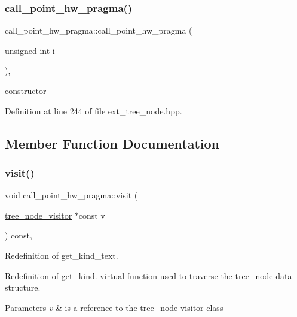 \subsubsection{\texorpdfstring{call\+\_\+point\+\_\+hw\+\_\+pragma()}{call\_point\_hw\_pragma()}}
{\footnotesize\ttfamily call\+\_\+point\+\_\+hw\+\_\+pragma\+::call\+\_\+point\+\_\+hw\+\_\+pragma (\begin{DoxyParamCaption}\item[{unsigned int}]{i }\end{DoxyParamCaption})\hspace{0.3cm}{\ttfamily [inline]}, {\ttfamily [explicit]}}



constructor 



Definition at line 244 of file ext\+\_\+tree\+\_\+node.\+hpp.



\subsection{Member Function Documentation}
\mbox{\label{structcall__point__hw__pragma_a3c039efe1da66ca0ab6445535aaa6eb2}} 
\subsubsection{\texorpdfstring{visit()}{visit()}}
{\footnotesize\ttfamily void call\+\_\+point\+\_\+hw\+\_\+pragma\+::visit (\begin{DoxyParamCaption}\item[{\hyperlink{classtree__node__visitor}{tree\+\_\+node\+\_\+visitor} $\ast$const}]{v }\end{DoxyParamCaption}) const\hspace{0.3cm}{\ttfamily [override]}, {\ttfamily [virtual]}}



Redefinition of get\+\_\+kind\+\_\+text. 

Redefinition of get\+\_\+kind. virtual function used to traverse the \hyperlink{classtree__node}{tree\+\_\+node} data structure. 
\begin{DoxyParams}{Parameters}
{\em v} & is a reference to the \hyperlink{classtree__node}{tree\+\_\+node} visitor class \\
\hline
\end{DoxyParams}


